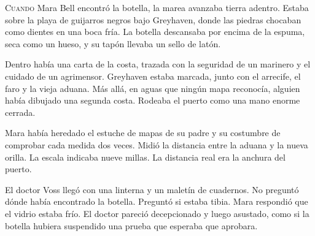 \lettrine[lines=3,loversize=0.12]{C}{uando} Mara Bell encontró la botella,
la marea avanzaba tierra adentro. Estaba sobre la playa de guijarros negros
bajo Greyhaven, donde las piedras chocaban como dientes en una boca fría.
La botella descansaba por encima de la espuma, seca como un hueso, y su
tapón llevaba un sello de latón.

Dentro había una carta de la costa, trazada con la seguridad de un marinero
y el cuidado de un agrimensor. Greyhaven estaba marcada, junto con el
arrecife, el faro y la vieja aduana. Más allá, en aguas que ningún mapa
reconocía, alguien había dibujado una segunda costa. Rodeaba el puerto como
una mano enorme cerrada.

Mara había heredado el estuche de mapas de su padre y su costumbre de
comprobar cada medida dos veces. Midió la distancia entre la aduana y la
nueva orilla. La escala indicaba nueve millas. La distancia real era la
anchura del puerto.

El doctor Voss llegó con una linterna y un maletín de cuadernos. No preguntó
dónde había encontrado la botella. Preguntó si estaba tibia. Mara respondió
que el vidrio estaba frío. El doctor pareció decepcionado y luego asustado,
como si la botella hubiera suspendido una prueba que esperaba que aprobara.
